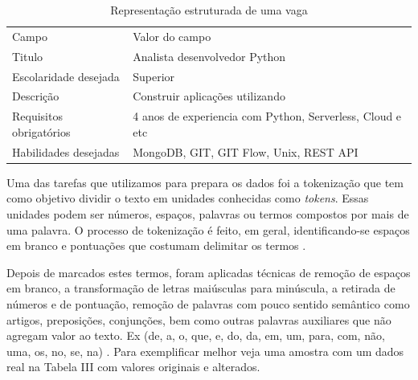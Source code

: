 \documentclass[conference]{IEEEtran}
\begin{document}
\begin{enumerate}
\begin{table}[h]
 \centering
 {\renewcommand\arraystretch{1.25}
\caption{Representação estruturada de uma vaga}
 \begin{tabular}{ l l }
  \cline{1-1}\cline{2-2}  
    \multicolumn{1}{|p{3.0cm}|}{\cellcolor{}Campo \centering } &
    \multicolumn{1}{p{4.217cm}|}{\cellcolor{}Valor do campo \centering }
  \\  
  \cline{1-1}\cline{2-2}  
    \multicolumn{1}{|p{3.0cm}|}{Titulo} &
    \multicolumn{1}{p{4.217cm}|}{ Analista desenvolvedor Python}
  \\  
  \cline{1-1}\cline{2-2}  
    \multicolumn{1}{|p{3.0cm}|}{  Escolaridade desejada } &
    \multicolumn{1}{p{4.217cm}|}{Superior}
  \\  
  \cline{1-1}\cline{2-2}  
    \multicolumn{1}{|p{3.0cm}|}{  Descrição} &
    \multicolumn{1}{p{4.217cm}|}{ Construir aplicações utilizando }
  \\  
  \cline{1-1}\cline{2-2}  
    \multicolumn{1}{|p{3.0cm}|}{  Requisitos obrigatórios } &
    \multicolumn{1}{p{4.217cm}|}{ 4 anos de experiencia com Python, Serverless, Cloud e etc}
  \\  
  \cline{1-1}\cline{2-2}  
    \multicolumn{1}{|p{3.0cm}|}{  Habilidades desejadas} &
    \multicolumn{1}{p{4.217cm}|}{ MongoDB, GIT, GIT Flow, Unix, REST API}
  \\  
  \hline
 \end{tabular} }
\end{table}


\end{enumerate}


Uma das tarefas que utilizamos para prepara os dados foi a tokenização que tem como objetivo dividir o texto em unidades conhecidas como \textit{tokens}. Essas unidades podem ser números, espaços, palavras ou termos compostos por mais de uma palavra. O processo de tokenização é feito, em geral, identificando-se espaços em branco e pontuações que costumam delimitar os termos \cite{tokenizacao}.

Depois de marcados estes termos, foram aplicadas técnicas de remoção de espaços em branco, a transformação de letras maiúsculas para minúscula, a retirada de números e de pontuação, remoção de palavras com pouco sentido semântico como artigos, preposições, conjunções, bem como outras palavras auxiliares que não agregam valor ao texto. Ex (de, a, o, que, e, do, da, em, um, para, com, não, uma, os, no, se, na) .
Para exemplificar melhor veja uma amostra com um dados real na Tabela III com valores originais e alterados.
\end{document}
